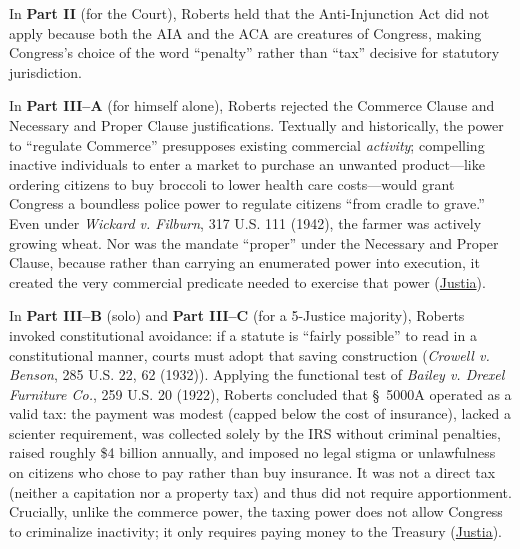 \documentclass[12pt]{article}
\begin{document}
In \textbf{Part II} (for the Court), Roberts held that the Anti-Injunction Act did not apply because both the AIA and the ACA are creatures of Congress, making Congress's choice of the word ``penalty'' rather than ``tax'' decisive for statutory jurisdiction.

In \textbf{Part III--A} (for himself alone), Roberts rejected the Commerce Clause and Necessary and Proper Clause justifications. Textually and historically, the power to ``regulate Commerce'' presupposes existing commercial \textit{activity}; compelling inactive individuals to enter a market to purchase an unwanted product---like ordering citizens to buy broccoli to lower health care costs---would grant Congress a boundless police power to regulate citizens ``from cradle to grave.'' Even under \textit{Wickard v. Filburn}, 317 U.S. 111 (1942), the farmer was actively growing wheat. Nor was the mandate ``proper'' under the Necessary and Proper Clause, because rather than carrying an enumerated power into execution, it created the very commercial predicate needed to exercise that power (\href{https://supreme.justia.com/cases/federal/us/567/519/}{Justia}).

In \textbf{Part III--B} (solo) and \textbf{Part III--C} (for a 5-Justice majority), Roberts invoked constitutional avoidance: if a statute is ``fairly possible'' to read in a constitutional manner, courts must adopt that saving construction (\textit{Crowell v. Benson}, 285 U.S. 22, 62 (1932)). Applying the functional test of \textit{Bailey v. Drexel Furniture Co.}, 259 U.S. 20 (1922), Roberts concluded that \S~5000A operated as a valid tax: the payment was modest (capped below the cost of insurance), lacked a scienter requirement, was collected solely by the IRS without criminal penalties, raised roughly \$4 billion annually, and imposed no legal stigma or unlawfulness on citizens who chose to pay rather than buy insurance. It was not a direct tax (neither a capitation nor a property tax) and thus did not require apportionment. Crucially, unlike the commerce power, the taxing power does not allow Congress to criminalize inactivity; it only requires paying money to the Treasury (\href{https://supreme.justia.com/cases/federal/us/567/519/}{Justia}).
\end{document}
